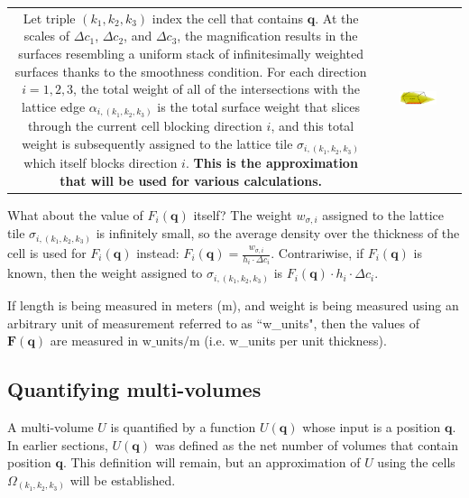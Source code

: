 \begin{tabular}{cc}
\parbox{0.5\textwidth}{
Let triple \((k_1, k_2, k_3)\) index the cell that contains \(\mathbf{q}\). At the scales of \(\Delta c_1\), \(\Delta c_2\), and \(\Delta c_3\), the magnification results in the surfaces resembling a uniform stack of infinitesimally weighted surfaces thanks to the smoothness condition. For each direction \(i = 1, 2, 3\), the total weight of all of the intersections with the lattice edge \(\alpha_{i, (k_1, k_2, k_3)}\) is the total surface weight that slices through the current cell blocking direction \(i\), and this total weight is subsequently assigned to the lattice tile \(\sigma_{i, (k_1, k_2, k_3)}\) which itself blocks direction \(i\). {\bf This is the approximation that will be used for various calculations.} 
} & \parbox{0.5\textwidth}{
\includegraphics[width = 0.5\textwidth]{Coordinate_systems/surface_density}
}
\end{tabular}

\vspace{5mm}

What about the value of \(F_i(\mathbf{q})\) itself? The weight \(w_{\sigma,i}\) assigned to the lattice tile \(\sigma_{i, (k_1,k_2,k_3)}\) is infinitely small, so the average density over the thickness of the cell is used for \(F_i(\mathbf{q})\) instead: \(F_i(\mathbf{q}) = \frac{w_{\sigma,i}}{h_i \cdot \Delta c_i}\). Contrariwise, if \(F_i(\mathbf{q})\) is known, then the weight assigned to \(\sigma_{i, (k_1,k_2,k_3)}\) is \(F_i(\mathbf{q}) \cdot h_i \cdot \Delta c_i\).

If length is being measured in meters (m), and weight is being measured using an arbitrary unit of measurement referred to as ``w\_units", then the values of \(\mathbf{F}(\mathbf{q})\) are measured in \(\text{w\_units}/\text{m}\) (i.e. w\_units per unit thickness).





\subsection{Quantifying multi-volumes}

A multi-volume \(U\) is quantified by a function \(U(\mathbf{q})\) whose input is a position \(\mathbf{q}\). In earlier sections, \(U(\mathbf{q})\) was defined as the net number of volumes that contain position \(\mathbf{q}\). This definition will remain, but an approximation of \(U\) using the cells \(\Omega_{(k_1, k_2, k_3)}\) will be established. 

